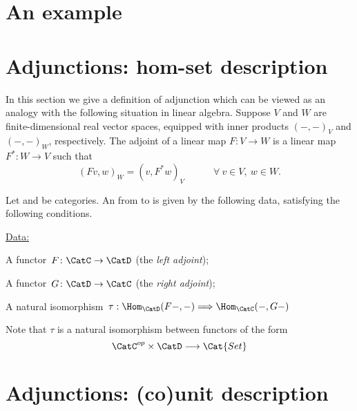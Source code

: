 
\section{An example}






\section{Adjunctions: hom-set description}

In this section we give a definition of adjunction which can be viewed as an analogy with the following situation in linear algebra. Suppose $V$ and $W$ are finite-dimensional real vector spaces, equipped with inner products $(-, -)_V$ and $(-, -)_W$, respectively. The adjoint of a linear map $F: V \rightarrow W$ is a linear map $F^*: W \rightarrow V$ such that 
$$
(Fv, w)_W = (v, F^*w)_V \quad \quad \quad \forall \ v \in V, \ w \in W. 
$$




\begin{ctdefinition}\label{def-adj-iso}
  \label{def:cat-adjunction}
  Let \CatC and \CatD be categories. An \emph{} from \CatC to \CatD is given by the following data, satisfying the following conditions.

  \underline{Data:}
  \begin{compactenum}
    \item A functor~$F\colon \CatC \to \CatD$ (the \emph{left adjoint});
    \item A functor~$G\colon \CatD \to \CatC$ (the \emph{right adjoint});
    \item A natural isomorphism~$\tau : \Hom_{\CatD}(F - , - ) \Longrightarrow \Hom_{\CatC}(- , G - )$
  \end{compactenum}
\end{ctdefinition}

\begin{remark}
Note that $\tau$ is a natural isomorphism between functors of the form
$$
\CatC^{op} \times \CatD \longrightarrow \Cat{Set}
$$
\end{remark}



\section{Adjunctions: (co)unit description}

